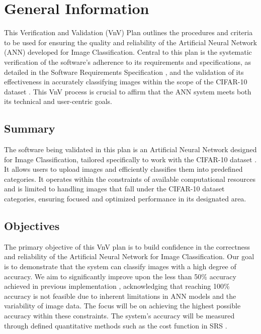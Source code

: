 \documentclass[12pt, titlepage]{article}
\begin{document}
\section{General Information}\label{GeneralInformation}

This Verification and Validation (VnV) Plan outlines the procedures and 
criteria to be used for ensuring the quality and reliability of the Artificial 
Neural Network (ANN) developed for Image Classification. Central to this plan is the 
systematic verification of the software's adherence to its requirements and specifications, 
as detailed in the Software Requirements Specification \citep{SRS}, and the validation of its 
effectiveness in accurately classifying images within the scope of the CIFAR-10 dataset \citep{CIFAR10}. 
This VnV process is crucial to affirm that the ANN system meets both its technical and user-centric goals.

\subsection{Summary}

The software being validated in this plan is an Artificial Neural Network designed for 
Image Classification, tailored specifically to work with the CIFAR-10 dataset \citep{CIFAR10}. 
It allows users to upload images and efficiently classifies them into predefined 
categories. It operates within the constraints of available computational 
resources and is limited to handling images that fall under the CIFAR-10 dataset \citep{CIFAR10}
categories, ensuring focused and optimized performance in its designated area.

\subsection{Objectives}

The primary objective of this VnV plan is to build confidence in the correctness and 
reliability of the Artificial Neural Network for Image Classification. Our goal is to 
demonstrate that the system can classify images with a high degree of accuracy. We aim 
to significantly improve upon the less than 50\% accuracy achieved in 
previous implementation \citep{ANN:CIFAR10}, 
acknowledging that reaching 100\% accuracy is not feasible due to inherent limitations in 
ANN models and the variability of image data. The focus will be on achieving the highest 
possible accuracy within these constraints. The system's accuracy will be measured through 
defined quantitative methods such as the cost function in SRS \citep{SRS}.
\end{document}
